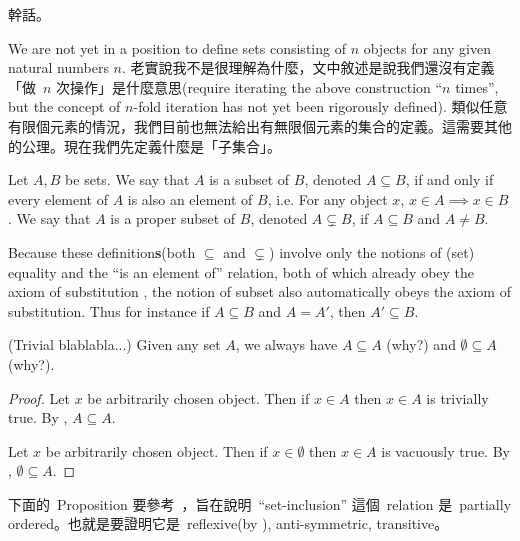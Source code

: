 \begin{remark}
幹話。
\end{remark}

\begin{note}
We are not yet in a position to define sets consisting of \(n\) objects for any given natural numbers \(n\). 老實說我不是很理解為什麼，文中敘述是說我們還沒有定義「做\ \(n\) 次操作」是什麼意思(require iterating the above construction ``\(n\) times'', but the concept of \(n\)-fold iteration has not yet been rigorously defined). 類似任意有限個元素的情況，我們目前也無法給出有無限個元素的集合的定義。這需要其他的公理。現在我們先定義什麼是「子集合」。
\end{note}

\begin{definition}[Subsets] \label{def 3.1.15}
Let \(A, B\) be sets. We say that \(A\) is a subset of \(B\), denoted \(A \subseteq B\), if and only if every element of \(A\) is also an element of \(B\), i.e. For any object \(x\), \(x \in A \implies x \in B\). We say that \(A\) is a proper subset of \(B\), denoted \(A \subsetneq B\), if \(A \subseteq B\) and \(A \neq B\).
\end{definition}

\begin{remark} \label{remark 3.1.16}
Because these definition\textbf{s}(both \(\subseteq\) and \(\subsetneq\)) involve only the notions of (set) equality and the “is an element of” relation, both of which already obey the axiom of substitution , the notion of subset also automatically obeys the axiom of substitution. Thus for instance if \(A \subseteq B\) and \(A = A'\), then \(A' \subseteq B\).
\end{remark}

\begin{example} \label{example 3.1.17}
(Trivial blablabla...) Given any set \(A\), we always have \(A \subseteq A\) (why?) and \(\emptyset \subseteq A\) (why?).
\end{example}

\begin{proof}
Let \(x\) be arbitrarily chosen object. Then if \(x \in A\) then \(x \in A\) is trivially true. By , \(A \subseteq A\).

Let \(x\) be arbitrarily chosen object. Then if \(x \in \emptyset\) then \(x \in A\) is vacuously true. By , \(\emptyset \subseteq A\).
\end{proof}

\begin{note}
下面的\ Proposition 要參考\ ，旨在說明\ ``set-inclusion'' 這個\ relation 是\ partially ordered。也就是要證明它是\ reflexive(by ), anti-symmetric, transitive。
\end{note}

